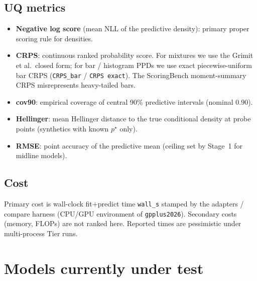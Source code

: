 \documentclass[11pt,a4paper]{article}
\theoremstyle{definition}
\begin{document}
\subsection{UQ metrics}
\begin{itemize}[leftmargin=1.4em,itemsep=0.15em]
  \item \textbf{Negative log score} (mean NLL of the predictive density): primary
        proper scoring rule for densities.
  \item \textbf{CRPS}: continuous ranked probability score. For mixtures we use
        the Grimit et al.\ closed form; for bar / histogram PPDs we use exact
        piecewise-uniform bar CRPS (\texttt{CRPS\_bar} / \texttt{CRPS exact}).
        The ScoringBench moment-summary CRPS misrepresents heavy-tailed bars.
  \item \textbf{cov90}: empirical coverage of central 90\% predictive intervals
        (nominal $0.90$).
  \item \textbf{Hellinger}: mean Hellinger distance to the true conditional
        density at probe points (synthetics with known $p^\star$ only).
  \item \textbf{RMSE}: point accuracy of the predictive mean (ceiling set by
        Stage~1 for midline models).
\end{itemize}

\subsection{Cost}
Primary cost is wall-clock fit$+$predict time \texttt{wall\_s} stamped by the
adapters / compare harness (CPU/GPU environment of
\texttt{gpplus2026}). Secondary costs (memory, FLOPs) are not ranked here.
Reported times are pessimistic under multi-process Tier runs.

\section{Models currently under test}
\label{sec:roster}
\end{document}
